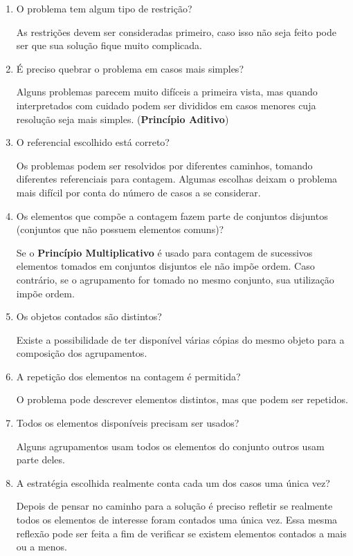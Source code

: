 \begin{enumerate}

    \item O problema tem algum tipo de restrição?
    
    As restrições devem ser consideradas primeiro, caso isso não seja feito pode ser que sua solução fique muito complicada.

    \item É preciso quebrar o problema em casos mais simples?
    
    Alguns problemas parecem muito difíceis a primeira vista, mas quando interpretados com cuidado podem ser divididos em casos menores cuja resolução seja mais simples. (\textbf{Princípio Aditivo})
    
    \item O referencial escolhido está correto?
    
    Os problemas podem ser resolvidos por diferentes caminhos, tomando diferentes referenciais para contagem. Algumas escolhas deixam o problema mais difícil por conta do número de casos a se considerar. 
    
    \item Os elementos que compõe a contagem fazem parte de conjuntos disjuntos (conjuntos que não possuem elementos comuns)?
    
    Se o \textbf{Princípio Multiplicativo} é usado para contagem de sucessivos elementos tomados em conjuntos disjuntos ele não impõe ordem. Caso contrário, se o agrupamento for tomado no mesmo conjunto, sua utilização impõe ordem. 
    
    \item Os objetos contados são distintos? 
    
    Existe a possibilidade de ter disponível várias cópias do mesmo objeto para a composição dos agrupamentos.
    
    \item A repetição dos elementos na contagem é permitida?
    
    O problema pode descrever elementos distintos, mas que podem ser repetidos.

    \item Todos os elementos disponíveis precisam ser usados?
    
    Alguns agrupamentos usam todos os elementos do conjunto outros usam parte deles. 
    
    \item A estratégia escolhida realmente conta cada um dos casos uma única vez? 
    
    Depois de pensar no caminho para a solução é preciso refletir se realmente todos os elementos de interesse foram contados uma única vez. Essa mesma reflexão pode ser feita a fim de verificar se existem elementos contados a mais ou a menos.
    
\end{enumerate}

